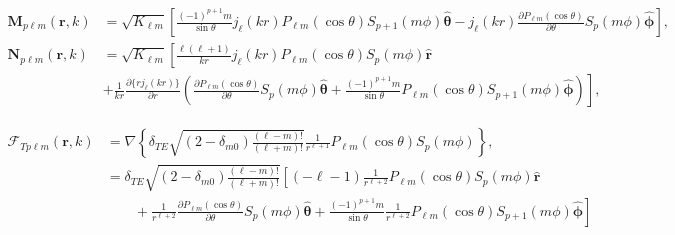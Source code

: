 \begin{equation}
\begin{split}
\mathbf{M}_{p\ell m}(\mathbf{r},k) &= \sqrt{K_{\ell m}}\left[\frac{(-1)^{p + 1}m}{\sin\theta}j_\ell(kr)P_{\ell m}(\cos\theta)S_{p+1}(m\phi)\hat{\bm{\theta}} - j_\ell(kr)\frac{\partial P_{\ell m}(\cos\theta)}{\partial\theta}S_p(m\phi)\hat{\bm{\phi}}\right],\\[0.5em]
\mathbf{N}_{p\ell m}(\mathbf{r},k) &= \sqrt{K_{\ell m}}\left[\frac{\ell(\ell + 1)}{kr}j_\ell(kr)P_{\ell m}(\cos\theta)S_p(m\phi)\hat{\mathbf{r}}\right.\\
&+ \left.\frac{1}{kr}\frac{\partial\{rj_\ell(kr)\}}{\partial r}\left(\frac{\partial P_{\ell m}(\cos\theta)}{\partial\theta}S_p(m\phi)\hat{\bm{\theta}} + \frac{(-1)^{p+1}m}{\sin\theta}P_{\ell m}(\cos\theta)S_{p + 1}(m\phi)\hat{\bm{\phi}}\right)\right],
\end{split}
\end{equation}


\begin{equation}
\begin{split}
\bm{\mathcal{F}}_{Tp\ell m}(\mathbf{r},k) &= \nabla\left\{\delta_{TE}\sqrt{(2 - \delta_{m0})\frac{(\ell - m)!}{(\ell + m)!}}\frac{1}{r^{\ell + 1}} P_{\ell m}(\cos\theta)S_p(m\phi)\right\},\\
&= \delta_{TE}\sqrt{(2 - \delta_{m0})\frac{(\ell - m)!}{(\ell + m)!}}\left[(-\ell - 1)\frac{1}{r^{\ell + 2}}P_{\ell m}(\cos\theta)S_p(m\phi)\hat{\mathbf{r}}\right.\\
&\qquad+ \left.\frac{1}{r^{\ell + 2}}\frac{\partial P_{\ell m}(\cos\theta)}{\partial \theta}S_p(m\phi)\hat{\bm{\theta}} + \frac{(-1)^{p+1}m}{\sin\theta}\frac{1}{r^{\ell + 2}}P_{\ell m}(\cos\theta)S_{p+1}(m\phi)\hat{\bm{\phi}} \right]
\end{split}
\end{equation}
 





